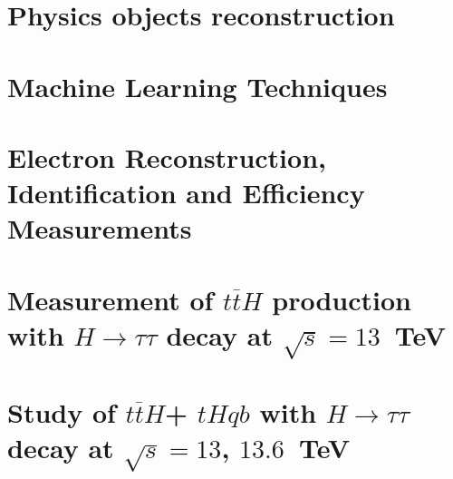 \documentclass[11pt,twoside]{book}
\newcommand*{\ttH}{\ensuremath{t\overline{t}H}\xspace}
\newcommand*{\thqb}{\ensuremath{tHqb}\xspace}
\newcommand*{\htautau}{\ensuremath{H\to\tau\tau}\xspace}
\begin{document}
\chapter{Physics objects reconstruction}
\label{chap:object_rec}


\chapter{Machine Learning Techniques}
\label{chap:machine_learning}


\chapter{Electron Reconstruction, Identification and Efficiency Measurements}
\label{chap:electrons}


\chapter{Measurement of \ttH production with $H \to \tau \tau$ decay at $\sqrt{s}=13$~TeV}
\label{chap:htautau}



\chapter{Study of \ttH + \thqb with \htautau decay at $\sqrt{s}=13$, $13.6$~TeV}
\label{chap:run3_tth}


\FloatBarrier
\end{document}
